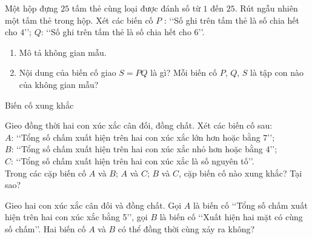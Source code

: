 \begin{vd}%
	Một hộp đựng $25$ tấm thẻ cùng loại được đánh số từ $1$ đến $25$. Rút ngẫu nhiên một tấm thẻ trong hộp. Xét các biến cố $P$ : \lq\lq  Số ghi trên tấm thẻ là số chia hết cho $4$\rq\rq; $Q$: \lq\lq  Số ghi trên tấm thẻ là số chia hết cho $6$\rq\rq.
	\begin{enumerate}
	\item Mô tả không gian mẫu.
	\item Nội dung của biến cố giao $S=P Q$ là gì? Mỗi biến cố $P$, $Q$, $S$ là tập con nào của không gian mẫu?
	\end{enumerate} 
\end{vd}
\begin{dang}{Biến cố xung khắc}
\end{dang}
\begin{vd}%
	Gieo đồng thời hai con xúc xắc cân đối, đồng chất. Xét các biến cố sau:\\
	$A$: \lq\lq  Tổng số chấm xuất hiện trên hai con xúc xắc lớn hơn hoặc bằng $7$\rq\rq;\\
	$B$: \lq\lq  Tổng số chấm xuất hiện trên hai con xúc xắc nhỏ hơn hoặc bằng $4$\rq\rq;\\
	$C$: \lq\lq  Tổng số chấm xuất hiện trên hai con xúc xắc là số nguyên tố\rq\rq.\\
	Trong các cặp biến cố $A$ và $B; \, A$ và $C; \, B$ và $C$, cặp biến cố nào xung khắc? Tại sao?
\end{vd}
\begin{vd}
	Gieo hai con xúc xắc cân đối và đồng chất. Gọi $A$ là biến cố \lq\lq  Tổng số chấm xuất hiện trên hai con xúc xắc bằng 5\rq\rq, gọi $B$ là biến cố \lq\lq  Xuất hiện hai mặt có cùng số chấm\rq\rq. Hai biến cố $A$ và $B$ có thể đồng thời cùng xảy ra không?
\end{vd}
